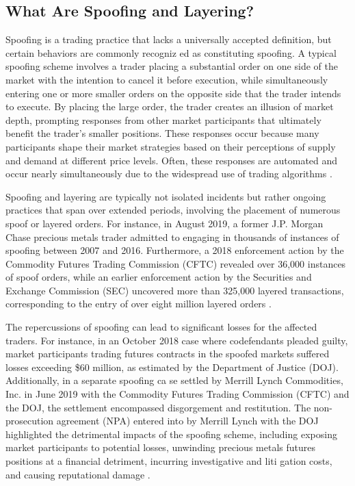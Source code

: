 \subsection{What Are Spoofing and Layering?}
Spoofing is a trading practice that lacks a universally accepted definition, but certain behaviors are commonly recogniz
ed as constituting spoofing. A typical spoofing scheme involves a trader placing a substantial order on one side of the
market with the intention to cancel it before execution, while simultaneously entering one or more smaller orders on the
opposite side that the trader intends to execute. By placing the large order, the trader creates an illusion of market
depth, prompting responses from other market participants that ultimately benefit the trader's smaller positions. These
responses occur because many participants shape their market strategies based on their perceptions of supply and demand
at different price levels. Often, these responses are automated and occur nearly simultaneously due to the widespread
use of trading algorithms \cite{corwin2012large, jarrow2011manipulation}.

Spoofing and layering are typically not isolated incidents but rather ongoing practices that span over extended periods,
involving the placement of numerous spoof or layered orders. For instance, in August 2019, a former J.P. Morgan Chase
precious metals trader admitted to engaging in thousands of instances of spoofing between 2007 and 2016. Furthermore, a
2018 enforcement action by the Commodity Futures Trading Commission (CFTC) revealed over 36,000 instances of spoof orders,
while an earlier enforcement action by the Securities and Exchange Commission (SEC) uncovered more than 325,000 layered
transactions, corresponding to the entry of over eight million layered orders \cite{cftc2018spoofing, sec2015spoofing}.

The repercussions of spoofing can lead to significant losses for the affected traders. For instance, in an October 2018
case where codefendants pleaded guilty, market participants trading futures contracts in the spoofed markets suffered
losses exceeding \$60 million, as estimated by the Department of Justice (DOJ). Additionally, in a separate spoofing ca
se settled by Merrill Lynch Commodities, Inc. in June 2019 with the Commodity Futures Trading Commission (CFTC) and the
DOJ, the settlement encompassed disgorgement and restitution. The non-prosecution agreement (NPA) entered into by Merrill
Lynch with the DOJ highlighted the detrimental impacts of the spoofing scheme, including exposing market participants to
potential losses, unwinding precious metals futures positions at a financial detriment, incurring investigative and liti
gation costs, and causing reputational damage \cite{doj2018spoofing, cftc2019merrill}.

